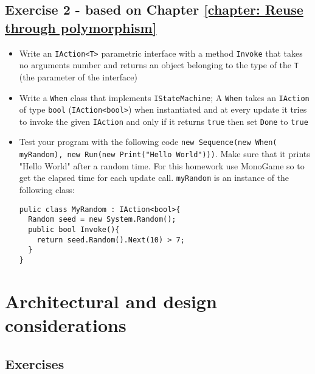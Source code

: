    \section{Exercise 2 - \small based on Chapter \ref{chapter: Reuse through polymorphism}}
         \begin{itemize}
         	\item Write an \texttt{IAction<T>} parametric interface with a method \texttt{Invoke} that takes no arguments number and returns an object belonging to the type of the \texttt{T} (the parameter of the interface)
         	\item Write a \texttt{When} class that implements \texttt{IStateMachine}; A \texttt{When} takes an \texttt{IAction} of type \texttt{bool} (\texttt{IAction<bool>}) when instantiated and at every update it tries to invoke the given \texttt{IAction} and only if it returns \texttt{true} then set \texttt{Done} to \texttt{true}
         	\item Test your program with the following code \texttt{new Sequence(new When(}\\ \texttt{myRandom), new Run(new Print("Hello World")))}. Make sure that it prints "Hello World" after a random time. For this homework use MonoGame so to get the elapsed time for each update call. \texttt{myRandom} is an instance of the following class:
         	\begin{lstlisting}
pulic class MyRandom : IAction<bool>{
  Random seed = new System.Random();
  public bool Invoke(){ 
    return seed.Random().Next(10) > 7; 
  }
}
\end{lstlisting}
\end{itemize}
         	



\chapter{Architectural and design considerations}
    \section{Exercises}

